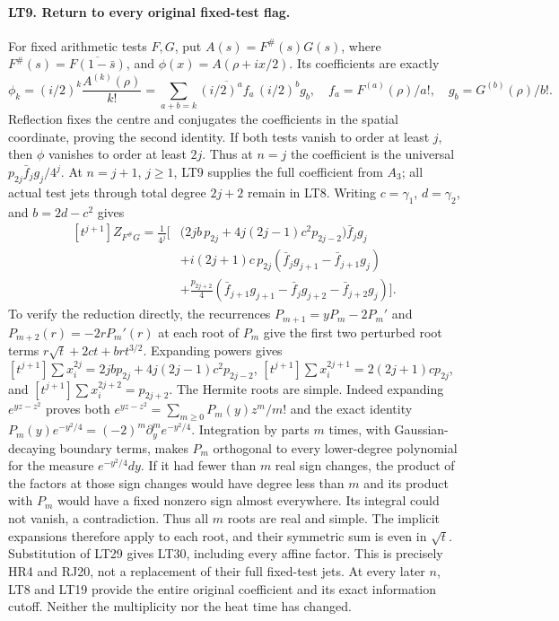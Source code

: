 \paragraph{LT9. Return to every original fixed-test flag.}
For fixed arithmetic tests $F,G$, put
$A(s)=F^\#(s)G(s)$, where
$F^\#(s)=\overline{F(1-\bar s)}$, and
$\phi(x)=A(\rho+ix/2)$. Its coefficients are exactly
\[
 \phi_k=(i/2)^k\frac{A^{(k)}(\rho)}{k!}
       =\sum_{a+b=k}\overline{(i/2)^af_a}\,(i/2)^bg_b,
 \quad f_a=F^{(a)}(\rho)/a!,\quad g_b=G^{(b)}(\rho)/b!.
 \tag{LT29}
\]
Reflection fixes the centre and conjugates the coefficients in
the spatial coordinate, proving the second identity.
If both tests vanish to order at least $j$, then $\phi$ vanishes
to order at least $2j$. Thus at $n=j$ the coefficient is the
universal $p_{2j}\bar f_jg_j/4^j$. At $n=j+1$, $j\ge1$,
LT9 supplies the full coefficient from $A_3$; all actual test
jets through total degree $2j+2$ remain in LT8.
Writing $c=\gamma_1$, $d=\gamma_2$, and $b=2d-c^2$ gives
\[
\begin{split}
[t^{j+1}]Z_{F^\#G}=\frac1{4^j}\bigg[&
 \bigl(2jb\,p_{2j}+4j(2j-1)c^2p_{2j-2}\bigr)\bar f_jg_j\\
 &+i(2j+1)c\,p_{2j}
            (\bar f_jg_{j+1}-\bar f_{j+1}g_j)\\
 &+\frac{p_{2j+2}}4
       (\bar f_{j+1}g_{j+1}-\bar f_jg_{j+2}-\bar f_{j+2}g_j)
 \bigg].
\end{split}
\tag{LT30}
\]
To verify the reduction directly, the recurrences
$P_{m+1}=yP_m-2P_m'$ and
$P_{m+2}(r)=-2rP_m'(r)$ at each root of $P_m$ give
the first two perturbed root terms
$r\sqrt t+2ct+b r t^{3/2}$. Expanding powers gives
$[t^{j+1}]\sum x_i^{2j}
=2jb p_{2j}+4j(2j-1)c^2p_{2j-2}$,
$[t^{j+1}]\sum x_i^{2j+1}=2(2j+1)cp_{2j}$,
and $[t^{j+1}]\sum x_i^{2j+2}=p_{2j+2}$.
The Hermite roots are simple. Indeed expanding
$e^{yz-z^2}$ proves both
$e^{yz-z^2}=\sum_{m\ge0}P_m(y)z^m/m!$ and the exact identity
$P_m(y)e^{-y^2/4}=(-2)^m\partial_y^m e^{-y^2/4}$.
Integration by parts $m$ times, with Gaussian-decaying boundary
terms, makes $P_m$ orthogonal to every lower-degree polynomial
for the measure $e^{-y^2/4}dy$. If it had fewer than $m$ real
sign changes, the product of the factors at those sign changes
would have degree less than $m$ and its product with $P_m$
would have a fixed nonzero sign almost everywhere. Its integral
could not vanish, a contradiction. Thus all $m$ roots are real
and simple.
The implicit expansions therefore apply to each root, and their
symmetric sum is even in $\sqrt t$. Substitution of LT29 gives
LT30, including every affine factor. This is precisely HR4 and
RJ20, not a replacement of their full fixed-test jets.
At every later $n$, LT8 and LT19 provide the entire original
coefficient and its exact information cutoff. Neither the
multiplicity nor the heat time has changed.

